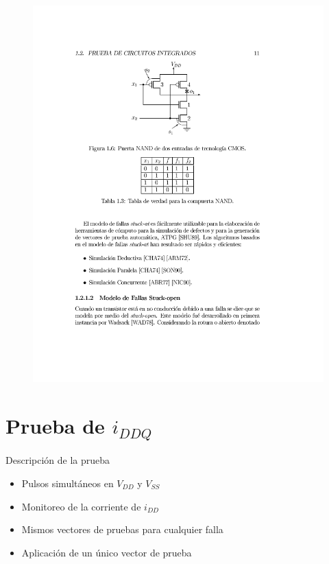 \documentclass[
paper=128mm:96mm, %
fontsize=11pt, %
pagesize, %
parskip=half-, %
]{scrartcl} %
\theoremstyle{mythmstyle} %
\newtheorem{theorem}{Theorem}[section] %
\newcommand*{\mybox}[2]{ %
\par\noindent
\begin{tikzpicture}[mynodestyle/.style={rectangle,draw=mygreen,thick,inner sep=2mm,text justified,top color=white,bottom color=white,above}]\node[mynodestyle,at={(0.5*#1+2mm+0.4pt,0)}]{ %
\begin{minipage}[t]{#1}
#2
\end{minipage}
};
\end{tikzpicture}
\par\vspace{-1.3em}}
\begin{document}
  \begin{figure}[h]
    \centering\includegraphics[width=0.5\linewidth]{stuckOpen}
  \end{figure}


\clearpage



\section{Prueba de $i_{DDQ}$}

Descripción de la prueba

\begin{multicols}{2} %
  \begin{itemize}
  \item Pulsos simultáneos en $V_{DD}$ y $V_{SS}$
  \item Monitoreo de la corriente de $i_{DD}$
  \item Mismos vectores de pruebas para cualquier falla
  \item Aplicación de un único vector de prueba
  \end{itemize}
\end{multicols}
\end{document}
